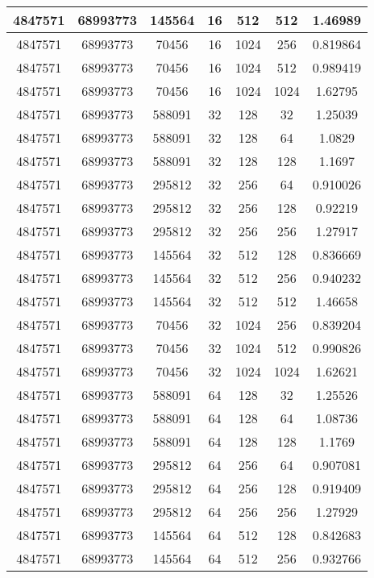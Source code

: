 \documentclass[9pt]{article}
\begin{document}
\begin{tabular}{|c|c|c|c|c|c|c| }
\hline
4847571  & 68993773  & 145564  & 16  & 512  & 512  & 1.46989 \\
\hline
4847571  & 68993773  & 70456  & 16  & 1024  & 256  & 0.819864 \\
\hline
4847571  & 68993773  & 70456  & 16  & 1024  & 512  & 0.989419 \\
\hline
4847571  & 68993773  & 70456  & 16  & 1024  & 1024  & 1.62795 \\
\hline
4847571  & 68993773  & 588091  & 32  & 128  & 32  & 1.25039 \\
\hline
4847571  & 68993773  & 588091  & 32  & 128  & 64  & 1.0829 \\
\hline
4847571  & 68993773  & 588091  & 32  & 128  & 128  & 1.1697 \\
\hline
4847571  & 68993773  & 295812  & 32  & 256  & 64  & 0.910026 \\
\hline
4847571  & 68993773  & 295812  & 32  & 256  & 128  & 0.92219 \\
\hline
4847571  & 68993773  & 295812  & 32  & 256  & 256  & 1.27917 \\
\hline
4847571  & 68993773  & 145564  & 32  & 512  & 128  & 0.836669 \\
\hline
4847571  & 68993773  & 145564  & 32  & 512  & 256  & 0.940232 \\
\hline
4847571  & 68993773  & 145564  & 32  & 512  & 512  & 1.46658 \\
\hline
4847571  & 68993773  & 70456  & 32  & 1024  & 256  & 0.839204 \\
\hline
4847571  & 68993773  & 70456  & 32  & 1024  & 512  & 0.990826 \\
\hline
4847571  & 68993773  & 70456  & 32  & 1024  & 1024  & 1.62621 \\
\hline
4847571  & 68993773  & 588091  & 64  & 128  & 32  & 1.25526 \\
\hline
4847571  & 68993773  & 588091  & 64  & 128  & 64  & 1.08736 \\
\hline
4847571  & 68993773  & 588091  & 64  & 128  & 128  & 1.1769 \\
\hline
4847571  & 68993773  & 295812  & 64  & 256  & 64  & 0.907081 \\
\hline
4847571  & 68993773  & 295812  & 64  & 256  & 128  & 0.919409 \\
\hline
4847571  & 68993773  & 295812  & 64  & 256  & 256  & 1.27929 \\
\hline
4847571  & 68993773  & 145564  & 64  & 512  & 128  & 0.842683 \\
\hline
4847571  & 68993773  & 145564  & 64  & 512  & 256  & 0.932766 \\

\end{tabular}
\end{document}
